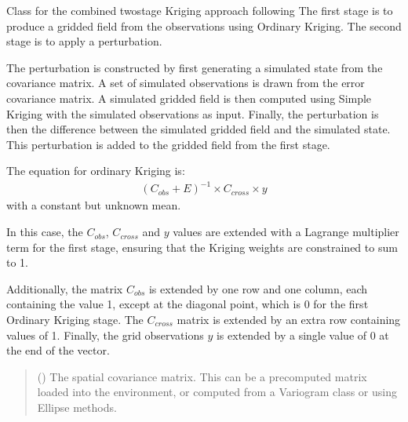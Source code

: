 \documentclass[letterpaper,10pt,english]{sphinxmanual}
\begin{document}
\begin{fulllineitems}
\label{\detokenize{kriging:glomar_gridding.stochastic.StochasticKriging}}
\pysigstartsignatures
\pysiglinewithargsret
{}
{}
{}
\pysigstopsignatures
\sphinxAtStartPar
Class for the combined two\sphinxhyphen{}stage Kriging approach following 
The first stage is to produce a gridded field from the observations using
Ordinary Kriging. The second stage is to apply a perturbation.

\sphinxAtStartPar
The perturbation is constructed by first generating a simulated state from
the covariance matrix. A set of simulated observations is drawn from the
error covariance matrix. A simulated gridded field is then computed using
Simple Kriging with the simulated observations as input. Finally, the
perturbation is then the difference between the simulated gridded field and
the simulated state. This perturbation is added to the gridded field from
the first stage.

\sphinxAtStartPar
The equation for ordinary Kriging is:
\begin{equation*}
\begin{split}(C_{obs} + E)^{-1} \times C_{cross} \times y\end{split}
\end{equation*}
\sphinxAtStartPar
with a constant but unknown mean.

\sphinxAtStartPar
In this case, the \(C_{obs}\), \(C_{cross}\) and \(y\) values
are extended with a Lagrange multiplier term for the first stage, ensuring
that the Kriging weights are constrained to sum to 1.

\sphinxAtStartPar
Additionally, the matrix \(C_{obs}\) is extended by one row and one
column, each containing the value 1, except at the diagonal point, which is
0 for the first Ordinary Kriging stage. The \(C_{cross}\) matrix is
extended by an extra row containing values of 1. Finally, the grid
observations \(y\) is extended by a single value of 0 at the end of the
vector.
\begin{quote}\begin{description}
\sphinxAtStartPar
{} () \textendash{} The spatial covariance matrix. This can be a pre\sphinxhyphen{}computed matrix loaded
into the environment, or computed from a Variogram class or using
Ellipse methods.


\end{description}
\end{quote}
\end{fulllineitems}
\end{document}
